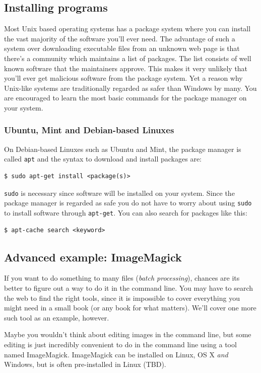 \subsection{Installing programs}
Most Unix based operating systems has a package system where you can install the vast majority of the software you'll ever need. The advantage of such a system over downloading executable files from an unknown web page is that there's a community which maintains a list of packages. The list consists of well known software that the maintainers approve. This makes it very unlikely that you'll ever get malicious software from the package system. Yet a reason why Unix-like systems are traditionally regarded as safer than Windows by many. You are encouraged to learn the most basic commands for the package manager on your system.

\subsubsection{Ubuntu, Mint and Debian-based Linuxes}
On Debian-based Linuxes such as Ubuntu and Mint, the package manager is called \verb|apt| and the syntax to download and install packages are:

\begin{verbatim}
$ sudo apt-get install <package(s)>
\end{verbatim}
\verb|sudo| is necessary since software will be installed on your system. Since the package manager is regarded as safe you do not have to worry about using \verb|sudo| to install software through \verb|apt-get|. You can also search for packages like this:

\begin{verbatim}
$ apt-cache search <keyword>
\end{verbatim}

\subsection{Advanced example: ImageMagick}
If you want to do something to many files (\emph{batch processing}), chances are its better to figure out a way to do it in the command line. You may have to search the web to find the right tools, since it is impossible to cover everything you might need in a small book (or any book for what matters). We'll cover one more such tool as an example, however.

Maybe you wouldn't think about editing images in the command line, but some editing is just incredibly convenient to do in the command line using a tool named ImageMagick. ImageMagick can be installed on Linux, OS X \emph{and} Windows, but is often pre-installed in Linux (TBD).

